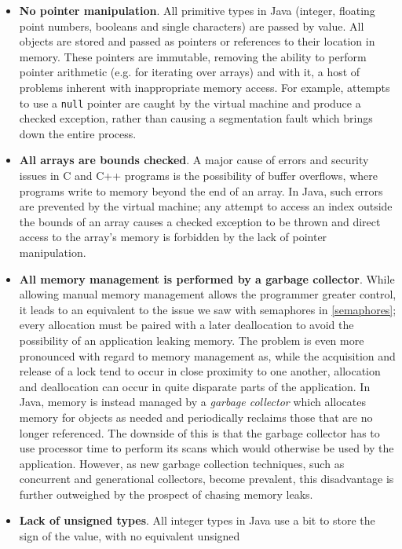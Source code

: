 \begin{itemize}
\item \textbf{No pointer manipulation}.  All primitive types in Java
  (integer, floating point numbers, booleans and single characters)
  are passed by value.  All objects are stored and passed as pointers
  or references to their location in memory.  These pointers are
  immutable, removing the ability to perform pointer arithmetic
  (e.g. for iterating over arrays) and with it, a host of problems
  inherent with inappropriate memory access.  For example, attempts to
  use a \texttt{null} pointer are caught by the virtual machine and
  produce a checked exception, rather than causing a segmentation
  fault which brings down the entire process.
\item \textbf{All arrays are bounds checked}.  A major cause of errors
  and security issues in C and C++ programs is the possibility of
  buffer overflows, where programs write to memory beyond the end of
  an array.  In Java, such errors are prevented by the virtual
  machine; any attempt to access an index outside the bounds of an
  array causes a checked exception to be thrown and direct access to
  the array's memory is forbidden by the lack of pointer manipulation.
\item \textbf{All memory management is performed by a garbage
  collector}.  While allowing manual memory management allows the
  programmer greater control, it leads to an equivalent to the issue
  we saw with semaphores in \ref{semaphores}; every allocation must be
  paired with a later deallocation to avoid the possibility of an
  application leaking memory.  The problem is even more pronounced
  with regard to memory management as, while the acquisition and
  release of a lock tend to occur in close proximity to one another,
  allocation and deallocation can occur in quite disparate parts of
  the application.  In Java, memory is instead managed by a
  \emph{garbage collector} which allocates memory for objects as
  needed and periodically reclaims those that are no longer
  referenced.  The downside of this is that the garbage collector has
  to use processor time to perform its scans which would otherwise be
  used by the application.  However, as new garbage collection
  techniques, such as concurrent and generational collectors, become
  prevalent, this disadvantage is further outweighed by the prospect
  of chasing memory leaks.
\item \textbf{Lack of unsigned types}.  All integer types in Java use
  a bit to store the sign of the value, with no equivalent unsigned

\end{itemize}
